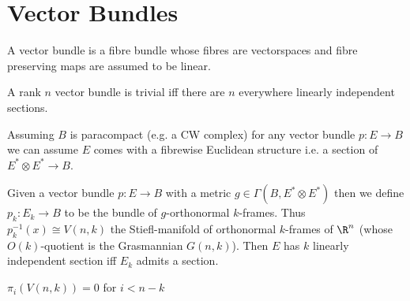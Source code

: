 \documentclass[12pt]{extarticle}
\begin{document}
\section{Vector Bundles}

\begin{definition}
A vector bundle is a fibre bundle whose fibres are vectorspaces and fibre preserving maps are assumed to be linear.
\end{definition}

\begin{lemma}
A rank $n$ vector bundle is trivial iff there are $n$ everywhere linearly independent sections.
\end{lemma}

\begin{rmk}
Assuming $B$ is paracompact (e.g. a CW complex) for any vector bundle $p : E \to B$ we can assume $E$ comes with a fibrewise Euclidean structure i.e. a section of $E^* \otimes E^* \to B$. 
\end{rmk}

\begin{defn}
Given a vector bundle $p : E \to B$ with a metric $g \in \Gamma(B, E^* \otimes E^*)$ then we define $p_k : E_k \to B$ to be the bundle of $g$-orthonormal $k$-frames. Thus $p_k^{-1}(x) \cong V(n, k)$ the Stiefl-manifold of orthonormal $k$-frames of $\R^n$ (whose $O(k)$-quotient is the Grasmannian $G(n, k)$). Then $E$ has $k$ linearly independent section iff $E_k$ admits a section. 
\end{defn}

\begin{lemma}
$\pi_i(V(n, k)) = 0$ for $i < n - k$
\end{lemma}
\end{document}
